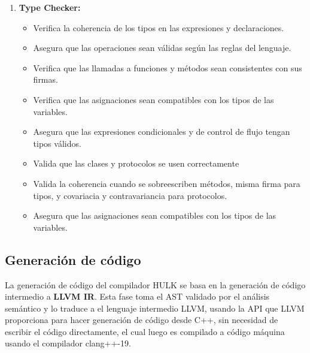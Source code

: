 \documentclass{article}
\begin{document}
\begin{enumerate}
  \item \textbf{Type Checker:} 
  \begin{itemize}
    \item Verifica la coherencia de los tipos en las expresiones y declaraciones.
    \item Asegura que las operaciones sean válidas según las reglas del lenguaje.
    \item Verifica que las llamadas a funciones y métodos sean consistentes con sus firmas.
    \item Verifica que las asignaciones sean compatibles con los tipos de las variables.
    \item Asegura que las expresiones condicionales y de control de flujo tengan tipos válidos.
    \item Valida que las clases y protocolos se usen correctamente
    \item Valida la coherencia cuando se sobreescriben métodos, misma firma para tipos, y covariacia y contravariancia para protocolos.
    \item Asegura que las asignaciones sean compatibles con los tipos de las variables.
  \end{itemize} 
\end{enumerate}

\subsection{Generación de código}

La generación de código del compilador HULK se basa en la generación de código intermedio a \textbf{LLVM IR}. Esta fase toma el AST validado por el análisis semántico y lo traduce a el lenguaje intermedio LLVM, usando la API 
que LLVM proporciona para hacer generación de código desde C++, sin necesidad de escribir el código directamente, el cual luego es compilado a código máquina usando el compilador clang++-19.
\end{document}
